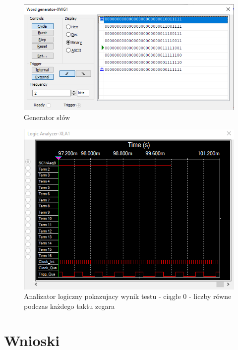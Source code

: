 \documentclass[12pt,a4paper,openright]{mwrep}
\begin{document}
\begin{figure}[H]
    \centering
    \includegraphics[width=1\textwidth]{images/2b_wg.png}
    \caption{Generator słów}
    \label{rys:2b_wg}
\end{figure}

\begin{figure}[H]
    \centering
    \includegraphics[width=1\textwidth]{images/2b_test_analyzer.png}
    \caption{Analizator logiczny pokazujacy wynik testu - ciągłe 0 - liczby równe podczas każdego taktu zegara}
    \label{rys:2b_test_analyzer}
\end{figure}

\section{Wnioski}
\end{document}
